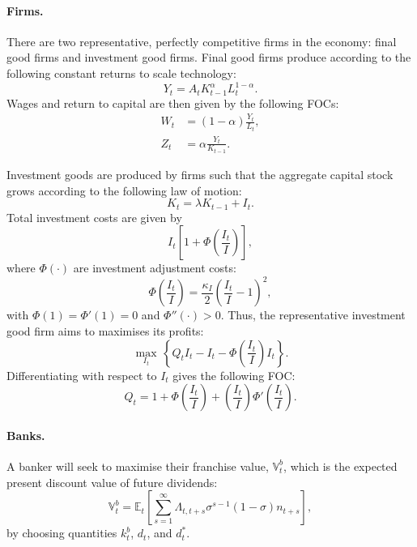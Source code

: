 \documentclass[12pt,english]{extarticle}
\newcommand{\E}{\mathbb{E}}
\begin{document}
	\paragraph{Firms.} There are two representative, perfectly competitive firms in the economy: final good firms and investment good firms. Final good firms produce according to the following constant returns to scale technology:
	\begin{equation}
		\label{eq: production, RBC-GK}
		Y_t = A_tK_{t-1}^\alpha L_t^{1-\alpha}.
	\end{equation}
	Wages and return to capital are then given by the following FOCs:
	\begin{align}
		\label{eq: wages, RBC-GK}
		W_t &= (1-\alpha)\frac{Y_t}{L_t}, \\
		\label{eq: rental rate, RBC-GK}
		Z_t &= \alpha\frac{Y_t}{K_{t-1}}.
	\end{align}
	
	Investment goods are produced by firms such that the aggregate capital stock grows according to the following law of motion:
	\begin{equation}
		\label{eq: law of motion of capital, RBC-GK}
		K_t = \lambda K_{t-1} + I_t.
	\end{equation}
	Total investment costs are given by 
	\begin{equation*}
		I_t\left[1 + \Phi\left(\frac{I_t}{I}\right)\right],
	\end{equation*}
	where $\Phi(\cdot)$ are investment adjustment costs:
	\begin{equation*}
		\Phi\left(\frac{I_t}{I}\right) = \frac{\kappa_I}{2}\left(\frac{I_t}{I} - 1\right)^2,
	\end{equation*}
	with $\Phi(1) = \Phi'(1) = 0$ and $\Phi''(\cdot) > 0$. Thus, the representative investment good firm aims to maximises its profits:
	\begin{equation*}
		\max_{I_t} \, \left\{Q_tI_t - I_t - \Phi\left(\frac{I_t}{I}\right)I_t\right\}.
	\end{equation*}
	Differentiating with respect to $I_t$ gives the following FOC:
	\begin{equation}
		\label{eq: equity price, RBC-GK}
		Q_t = 1 + \Phi\left(\frac{I_t}{I}\right) + \left(\frac{I_t}{I}\right)\Phi'\left(\frac{I_t}{I}\right).
	\end{equation}
	
	
	\paragraph{Banks.} A banker will seek to maximise their franchise value, $\mathbb{V}_t^b$, which is the expected present discount value of future dividends:
	\begin{equation*}
		\mathbb{V}_t^b = \E_t\left[ \sum_{s=1}^\infty \Lambda_{t,t+s}\sigma^{s-1}(1-\sigma)n_{t+s} \right], 
	\end{equation*}
	by choosing quantities $k_t^b$, $d_t$, and $d_t^*$.
	
\end{document}
